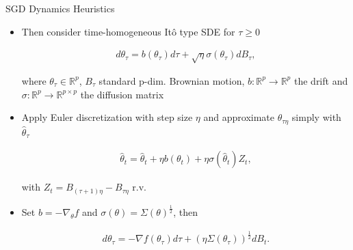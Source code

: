\documentclass[fleqn]{beamer}
\begin{document}
    \begin{frame}{SGD Dynamics Heuristics}
        \begin{itemize}[<+->]
            \item Then consider  time-homogeneous It\^o type SDE for $\tau\ge 0$
            \begin{center}
            \begin{minipage}{0.5\textwidth}
                \begin{align*}
                    d\theta_\tau = b(\theta_\tau)d\tau
                    +\sqrt{\eta}\sigma(\theta_\tau)dB_\tau,
                \end{align*}
            \end{minipage}
            \end{center}
            where $\theta_\tau \in \mathbb{R}^{p}$, $B_\tau$ standard p-dim.
            Brownian
            motion, $b:\mathbb{R}^{p} \to \mathbb{R}^{p}$ the drift and
            $\sigma: \mathbb{R}^{p}\to \mathbb{R}^{p\times p}$ the diffusion
            matrix

        \item Apply Euler discretization with step size $\eta$ and
            approximate $\theta_{\tau \eta}$ simply with $\hat{\theta}_{\tau}$
            \begin{center}
            \begin{minipage}{0.5\textwidth}
                \begin{align*}
                    \hat{\theta}_t= \hat{\theta}_t + \eta b(\theta_t)
                    +\eta \sigma(\hat{\theta}_t)Z_t,
                \end{align*}
            \end{minipage}
            \end{center}
            with $Z_t = B_{(\tau+1)\eta} - B_{\tau\eta}$ r.v.

        \item Set $b = -\nabla_\theta f$ and $\sigma(\theta) =
            \Sigma(\theta)^{\frac{1}{2}}$, then
            \begin{center}
            \begin{minipage}{0.5\textwidth}
                \begin{align*}
                    d\theta_\tau = -\nabla f(\theta_\tau)d\tau
                    + (\eta\Sigma(\theta_\tau))^{\frac{1}{2}} dB_t.
                \end{align*}
            \end{minipage}
            \end{center}
        \end{itemize}
    \end{frame}
\end{document}
